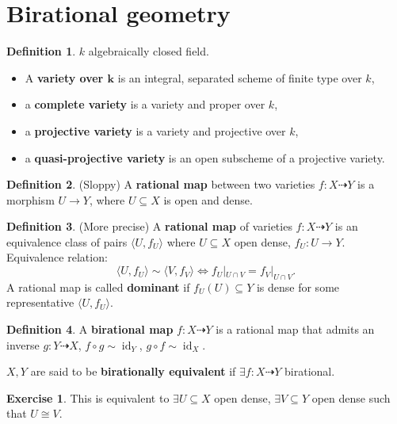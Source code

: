 \documentclass[12pt]{article}
\DeclareMathOperator{\id}{id}
\theoremstyle{definition}
\newtheorem*{definition}{Definition}
\newtheorem*{exercise}{Exercise}
\begin{document}
\section{Birational geometry}
\begin{definition}
$k$ algebraically closed field.
\begin{itemize}
\item A \textbf{variety over $\boldsymbol k$} is an integral, separated scheme of finite type over $k$,
\item a \textbf{complete variety} is a variety and proper over $k$,
\item a \textbf{projective variety} is a variety and projective over $k$,
\item a \textbf{quasi-projective variety} is an open subscheme of a projective variety.
\end{itemize}
\end{definition}

\begin{definition}
(Sloppy) A \textbf{rational map} between two varieties $f:X\dashrightarrow Y$ is a morphism $U\rightarrow Y$, where $U\subseteq X$ is open and dense.
\end{definition}

\begin{definition}
(More precise) A \textbf{rational map} of varieties $f:X\dashrightarrow Y$ is an equivalence class of pairs $\langle U,f_U\rangle$ where $U\subseteq X$ open dense, $f_U:U\rightarrow Y$. Equivalence relation:
\[\langle U,f_U\rangle\sim\langle V,f_V\rangle\Longleftrightarrow f_U|_{U\cap V}=f_V|_{U\cap V}.\]
A rational map is called \textbf{dominant} if $f_U(U)\subseteq Y$ is dense for some representative $\langle U,f_U\rangle$.
\end{definition}

\begin{definition}
A \textbf{birational map} $f:X\dashrightarrow Y$ is a rational map that admits an inverse $g:Y\dashrightarrow X$, $f\circ g\sim\id_Y$, $g\circ f\sim\id_X$.

$X,Y$ are said to be \textbf{birationally equivalent} if $\exists f:X\dashrightarrow Y$ birational.
\end{definition}

\begin{exercise}
This is equivalent to $\exists U\subseteq X$ open dense, $\exists V\subseteq Y$ open dense such that $U\cong V$.
\end{exercise}
\end{document}
